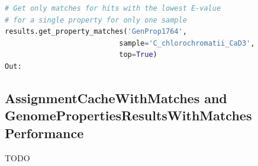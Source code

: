 \begin{lstlisting}[language=Python]  
# Get only matches for hits with the lowest E-value 
# for a single property for only one sample                                     
results.get_property_matches('GenProp1764', 
                           sample='C_chlorochromatii_CaD3',
                           top=True)
Out:
\end{lstlisting}

\begin{table}[!ht]
\centering
{}
\end{table}

\subsection{AssignmentCacheWithMatches and GenomePropertiesResultsWithMatches Performance}

TODO